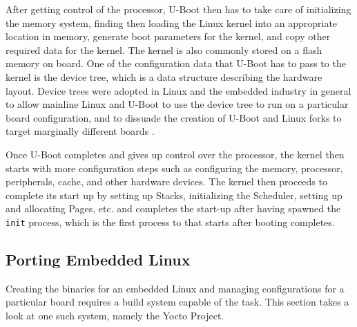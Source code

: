 \begin{figure}[h]
	\centering
\end{figure}

After getting control of the processor, U-Boot then has to take care of initializing the memory system, finding then loading the Linux kernel into an appropriate location in memory, generate boot parameters for the kernel, and copy other required data for the kernel. The kernel is also commonly stored on a flash memory on board. One of the configuration data that U-Boot has to pass to the kernel is the device tree, which is a data structure describing the hardware layout. Device trees were adopted in Linux and the embedded industry in general to allow mainline Linux and U-Boot to use the device tree to run on a particular board configuration, and to dissuade the creation of U-Boot and Linux forks to target marginally different boards \cite{device-tree}.

Once U-Boot completes and gives up control over the processor, the kernel then starts with more configuration steps such as configuring the memory, processor, peripherals, cache, and other hardware devices. The kernel then proceeds to complete its start up by setting up Stacks, initializing the Scheduler, setting up and allocating Pages, etc. and completes the start-up after having spawned the \texttt{init} process, which is the first process to that starts after booting completes.


\subsection{Porting Embedded Linux}

Creating the binaries for an embedded Linux and managing configurations for a particular board requires a build system capable of the task. This section takes a look at one such system, namely the Yocto Project.

